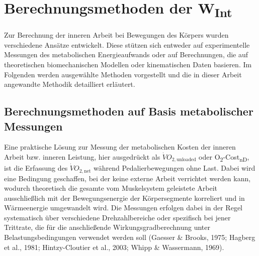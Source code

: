 \documentclass[
  letterpaper,
  DIV=11]{scrartcl}
\begin{document}
\section{\texorpdfstring{Berechnungsmethoden der
W\textsubscript{Int}}{Berechnungsmethoden der WInt}}\label{berechnungsmethoden-der-wint}

Zur Berechnung der inneren Arbeit bei Bewegungen des Körpers wurden
verschiedene Ansätze entwickelt. Diese stützen sich entweder auf
experimentelle Messungen des metabolischen Energieaufwands oder auf
Berechnungen, die auf theoretischen biomechanischen Modellen oder
kinematischen Daten basieren. Im Folgenden werden ausgewählte Methoden
vorgestellt und die in dieser Arbeit angewandte Methodik detailliert
erläutert.

\subsection{Berechnungsmethoden auf Basis metabolischer
Messungen}\label{berechnungsmethoden-auf-basis-metabolischer-messungen}

Eine praktische Lösung zur Messung der metabolischen Kosten der inneren
Arbeit bzw. inneren Leistung, hier ausgedrückt als
\(\dot{V}O_{2,\text{unloaded}}\) oder
O\textsubscript{2}-Cost\textsubscript{nD}, ist die Erfassung des
\(\dot{V}O_{2,\text{net}}\) während Pedalierbewegungen ohne Last. Dabei
wird eine Bedingung geschaffen, bei der keine externe Arbeit verrichtet
werden kann, wodurch theoretisch die gesamte vom Muskelsystem geleistete
Arbeit ausschließlich mit der Bewegungsenergie der Körpersegmente
korreliert und in Wärmeenergie umgewandelt wird. Die Messungen erfolgen
dabei in der Regel systematisch über verschiedene Drehzahlbereiche oder
spezifisch bei jener Trittrate, die für die anschließende
Wirkungsgradberechnung unter Belastungsbedingungen verwendet werden soll
(Gaesser \& Brooks, 1975; Hagberg et al., 1981; Hintzy-Cloutier et al.,
2003; Whipp \& Wassermann, 1969).
\end{document}
